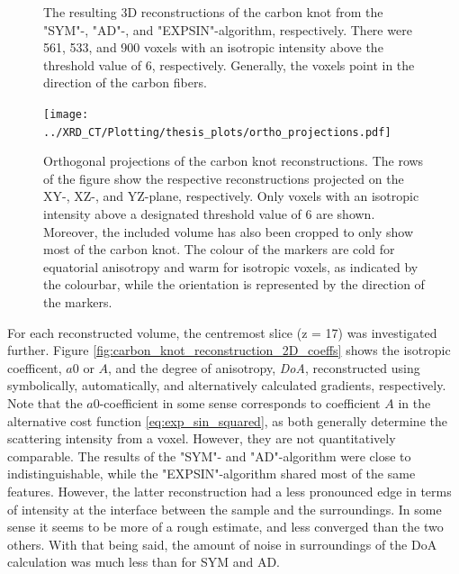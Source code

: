 \begin{figure}[h!]
    

    \caption[3D Reconstructions of Carbon Knot]{ The resulting 3D reconstructions of the carbon knot from the "SYM"-, "AD"-, and "EXPSIN"-algorithm, respectively.
        There were 561, 533, and 900 voxels with an isotropic intensity above the threshold value of 6, respectively. Generally, the voxels point in the direction of the carbon fibers.
    }
    \label{fig:carbon_knot_reconstruction_3D}
\end{figure}

\clearpage

\begin{figure}

    \centering

    \texttt{[image: ../XRD\_CT/Plotting/thesis\_plots/ortho\_projections.pdf]}
    
    \caption[Orthogonal Projections of Carbon Knot]{ Orthogonal projections of the carbon knot reconstructions.
        The rows of the figure show the respective reconstructions projected on the XY-, XZ-, and YZ-plane, respectively.
        Only voxels with an isotropic intensity above a designated threshold value of 6 are shown.
        Moreover, the included volume has also been cropped to only show most of the carbon knot.
        The colour of the markers are cold for equatorial anisotropy and warm for isotropic voxels, as indicated by the colourbar, while the orientation is represented by the direction of the markers.
    }
    \label{fig:carbon_knot_ortho}

\end{figure}

\clearpage

For each reconstructed volume, the centremost slice (z = 17) was investigated further.
Figure \ref{fig:carbon_knot_reconstruction_2D_coeffs} shows the isotropic coefficent, $a0$ or $A$, and the degree of anisotropy, \emph{DoA}, reconstructed using symbolically, automatically, and alternatively calculated gradients, respectively.
Note that the $a0$-coefficient in some sense corresponds to coefficient $A$ in the alternative cost function \eqref{eq:exp_sin_squared}, as both generally determine the scattering intensity from a voxel.
However, they are not quantitatively comparable.
The results of the "SYM"- and "AD"-algorithm were close to indistinguishable,
while the "EXPSIN"-algorithm shared most of the same features.
However, the latter reconstruction had a less pronounced edge in terms of intensity at the interface between the sample and the surroundings.
In some sense it seems to be more of a rough estimate, and less converged than the two others.
With that being said, the amount of noise in surroundings of the DoA calculation was much less than for SYM and AD.

